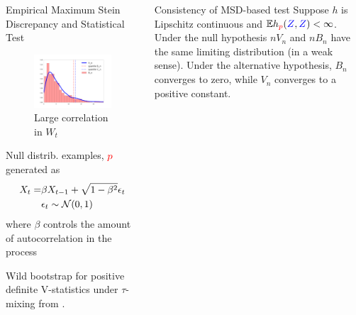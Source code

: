 \begin{frame}
\begin{columns}
\begin{column}{.33\linewidth}
\begin{block}{Empirical Maximum Stein Discrepancy and Statistical Test}
 \begin{center}
  \begin{minipage}{.49\linewidth}
\begin{figure}
 \includegraphics[width=\textwidth]{../../presentation/img/bootstrapWorks7.pdf}
 \caption{%
 Large correlation in $W_t$} 
\end{figure}
  \end{minipage}
\begin{minipage}{.49\linewidth}
Null distrib. examples, ${\color{red} p}$ generated as
\begin{align*}
 X_t =& \beta X_{t-1} + \sqrt{1 - \beta^2}\epsilon_t\\
 & \epsilon_t \sim {\cal N}(0,1)
\end{align*}
 where $\beta$ controls the amount of autocorrelation in the process
\end{minipage}
\end{center}

 Wild bootstrap for positive definite V-statistics under $\tau$-mixing from \cite{leucht_dependent_2013}.
\end{block}
\end{column}


\hspace{-1.45cm}


\begin{column}{.32\linewidth}
\begin{block}{Consistency of MSD-based test}
\large
 Suppose  $h$ is Lipschitz continuous and
$\mathbb{E} h_{{ \color{red} p}}({ \color{blue} Z},{ \color{blue} Z})<\infty$. Under the null hypothesis $nV_n$ and $nB_n$ have the same limiting distribution (in a weak sense). Under the alternative hypothesis,
$B_{n}$ converges to zero, while $V_{n}$ converges to a positive
constant.


\end{block}
\end{column}
\end{columns}
\end{frame}

